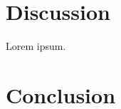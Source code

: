 \documentclass[12pt,twocolumn,tighten]{aastex62}
\begin{document}



\section{Discussion}
\label{sec:discussion}

Lorem ipsum.

\section{Conclusion}
\label{sec:conclusion}

\end{document}
